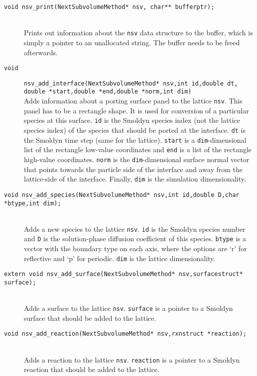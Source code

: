 \documentclass {book}
\newcommand {\ttt} {\texttt}
\begin{document}
\begin{description}
\item[\ttt{void nsv\_print(NextSubvolumeMethod* nsv, char** bufferptr);}]
\hfill \\
Prints out information about the \ttt{nsv} data structure to the buffer, which is simply a pointer to an unallocated string. The buffer needs to be freed afterwards.

\item[\ttt{void}]
\ttt{nsv\_add\_interface(NextSubvolumeMethod* nsv,int id,double dt, double *start,double *end,double *norm,int dim)}
\hfill \\
Adds information about a porting surface panel to the lattice \ttt{nsv}. This panel has to be a rectangle shape. It is used for conversion of a particular species at this surface. \ttt{id} is the Smoldyn species index (not the lattice species index) of the species that should be ported at the interface. \ttt{dt} is the Smoldyn time step (same for the lattice). \ttt{start} is a \ttt{dim}-dimensional list of the rectangle low-value coordinates and \ttt{end} is a list of the rectangle high-value coordinates. \ttt{norm} is the \ttt{dim}-dimensional surface normal vector that points towards the particle side of the interface and away from the lattice-side of the interface. Finally, \ttt{dim} is the simulation dimensionality.

\item[\ttt{void nsv\_add\_species(NextSubvolumeMethod* nsv,int id,double D,char *btype,int dim);}]
\hfill \\
Adds a new species to the lattice \ttt{nsv}. \ttt{id} is the Smoldyn species number and \ttt{D} is the solution-phase diffusion coefficient of this species. \ttt{btype} is a vector with the boundary type on each axis, where the options are `r' for reflective and `p' for periodic. \ttt{dim} is the lattice dimensionality.

\item[\ttt{extern void nsv\_add\_surface(NextSubvolumeMethod* nsv,surfacestruct* surface);}]
\hfill \\
Adds a surface to the lattice \ttt{nsv}. \ttt{surface} is a pointer to a Smoldyn surface that should be added to the lattice.

\item[\ttt{void nsv\_add\_reaction(NextSubvolumeMethod* nsv,rxnstruct *reaction);}]
\hfill \\
Adds a reaction to the lattice \ttt{nsv}. \ttt{reaction} is a pointer to a Smoldyn reaction that should be added to the lattice.


\end{description}
\end{document}
